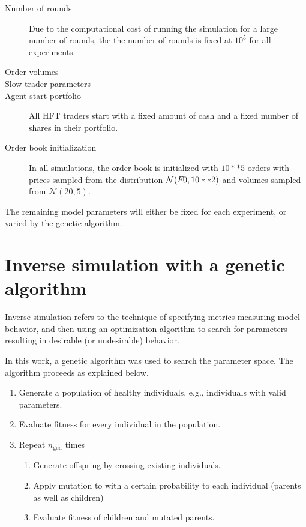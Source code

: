 \begin{description}
	\item [Number of rounds] Due to the computational cost of running the simulation for a large number of rounds, the the number of rounds is fixed at $10^5$ for all experiments.
	\item [Order volumes] 
	\item[Slow trader parameters]
	\item[Agent start portfolio] All HFT traders start with a fixed amount of cash and a fixed number of shares in their portfolio.
	\item[Order book initialization] In all simulations, the order book is initialized with $10**5 $ orders with prices sampled from the distribution $\mathcal{N}(F_{}{0}, 10**2)$ and volumes sampled  from $\mathcal{N}(20, 5)$.
\end{description}

The remaining model parameters will either be fixed for each experiment, or varied by the genetic algorithm. 



\section{Inverse simulation with a genetic algorithm}\label{section:genetic_algorithm}
Inverse simulation refers to the technique of specifying metrics measuring model behavior, and then using an optimization algorithm to search for parameters resulting in desirable (or undesirable) behavior. 

In this work, a genetic algorithm was used to search the parameter space. The algorithm proceeds as explained below.
\begin{enumerate}
	\item Generate a population of healthy individuals, e.g., individuals with valid parameters.
	\item Evaluate fitness for every individual in the population.
	\item Repeat $n_\text{gen}$ times 
	\begin{enumerate}
		\item Generate offspring by crossing existing individuals.
		\item Apply mutation to with a certain probability to each individual (parents as well as children)
		\item Evaluate fitness of children and mutated parents.
	\end{enumerate}
\end{enumerate}

